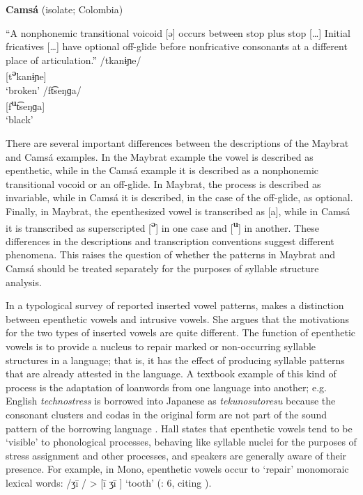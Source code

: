 \ea\label{ex:3.9}
  \textbf{Camsá} (isolate; Colombia)

“A nonphonemic transitional voicoid [ə] occurs between stop plus stop […] Initial fricatives […] have optional off-glide before nonfricative consonants at a different place of articulation.” 
\ea   /tkanɨɲe/\\{}
  [t\textbf{\textsuperscript{ə}}kanɨɲe]\\
\glt  ‘broken’
\ex   /ft͡seŋɡa/\\{}
  [f\textbf{\textsuperscript{u}}t͡seŋɡa]\\
\glt  ‘black’
\citep[81]{Howard1967}
\z
\z

  There are several important differences between the descriptions of the Maybrat and Camsá examples. In the Maybrat example the vowel is described as epenthetic, while in the Camsá example it is described as a nonphonemic transitional vocoid or an off-glide. In Maybrat, the process is described as invariable, while in Camsá it is described, in the case of the off-glide, as optional. Finally, in Maybrat, the epenthesized vowel is transcribed as [a], while in Camsá it is transcribed as superscripted [\textbf{\textsuperscript{ə}}] in one case and [\textbf{\textsuperscript{u}}] in another. These differences in the descriptions and transcription conventions suggest different phenomena. This raises the question of whether the patterns in Maybrat and Camsá should be treated separately for the purposes of syllable structure analysis.

  In a typological survey of reported inserted vowel patterns, \citet{Hall2006} makes a distinction between epenthetic vowels and intrusive vowels. She argues that the motivations for the two types of inserted vowels are quite different. The function of epenthetic vowels is to provide a nucleus to repair marked or non-occurring syllable structures in a language; that is, it has the effect of producing syllable patterns that are already attested in the language. A textbook example of this kind of process is the adaptation of loanwords from one language into another; e.g. English \textit{technostress} is borrowed into Japanese as \textit{tekunosutoresu} because the consonant clusters and codas in the original form are not part of the sound pattern of the borrowing language \citep[69]{Kay1995}. Hall states that epenthetic vowels tend to be ‘visible’ to phonological processes, behaving like syllable nuclei for the purposes of stress assignment and other processes, and speakers are generally aware of their presence. For example, in Mono, epenthetic vowels occur to ‘repair’ monomoraic lexical words: /ʒi\={} / > [i\={} ʒi\={} ] ‘tooth’ (\citealt{Hall2006}: 6, citing \citealt{Olson2003}).

